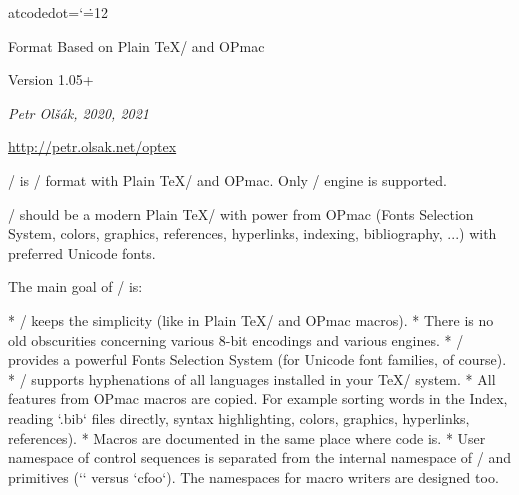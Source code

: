 

  \let\enddocument=\endinput
\let\_catcodedot=\relax \catcode`\.=12 %

\typosize[10/12]  %

\begingroup \typosize [11/13.5] %



\centerline{\rm\OpTeX}
\vskip-8mm

\tit Format Based on Plain \TeX/ and OPmac

\hfill Version 1.05+

\centerline{\it Petr Olšák, 2020, 2021}

\bigskip
\centerline{\url{http://petr.olsak.net/optex}}


\bigskip
\noindent
\OpTeX/ is \LuaTeX/ format with Plain \TeX/ and OPmac. Only \LuaTeX/ engine
is supported. 

\OpTeX/ should be a modern Plain \TeX/ with power from OPmac (Fonts
Selection System, colors, graphics, references, hyperlinks,
indexing, bibliography, ...) with preferred Unicode fonts.

The main goal of \OpTeX/ is:

\begitems
* \OpTeX/ keeps the simplicity (like in Plain \TeX/ and OPmac macros).
* There is no old obscurities concerning various 8-bit encodings and
  various engines.
* \OpTeX/ provides a powerful Fonts Selection System (for Unicode font
  families, of course).
* \OpTeX/ supports hyphenations of all languages installed in your \TeX/ system.
* All features from OPmac macros are copied. For example sorting words in
  the Index, reading `.bib` files directly, syntax 
  highlighting, colors, graphics, hyperlinks, references).
* Macros are documented in the same place where code is.
* User namespace of control sequences is separated from the internal namespace
  of \OpTeX/ and primitives (`\foo` versus `\_foo`).
  The namespaces for macro writers are designed too.
\enditems

